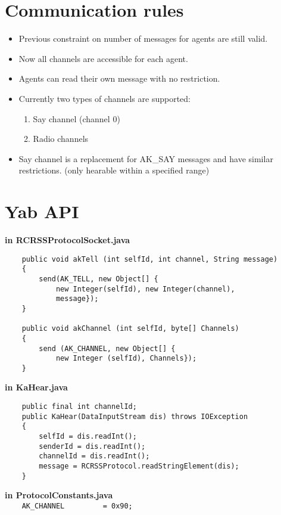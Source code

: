 \documentclass{article}
\begin{document}
\section{Communication rules}
\begin{itemize}
	\item Previous constraint on number of messages for agents are still valid.
	\item Now all channels are accessible for each agent.
	\item Agents can read their own message with no restriction.
	\item Currently two types of channels are supported:
	\begin{enumerate}
		\item Say channel (channel 0)
		\item Radio channels
	\end{enumerate}
	\item Say channel is a replacement for AK\_SAY messages and have
	similar restrictions. (only hearable within a specified range)
\end{itemize}
 
\newpage 
\appendix

\section{Yab API}
\label{yab}
\textbf{in RCRSSProtocolSocket.java}
\begin{verbatim}
    public void akTell (int selfId, int channel, String message)
    {
        send(AK_TELL, new Object[] {
            new Integer(selfId), new Integer(channel),   
            message});
    }
    
    public void akChannel (int selfId, byte[] Channels)
    {
        send (AK_CHANNEL, new Object[] {
            new Integer (selfId), Channels});  
    }
\end{verbatim}
\textbf{in KaHear.java}
\begin{verbatim}
    public final int channelId;
    public KaHear(DataInputStream dis) throws IOException 
    {
        selfId = dis.readInt();
        senderId = dis.readInt();
        channelId = dis.readInt();
        message = RCRSSProtocol.readStringElement(dis);
    }
\end{verbatim}
\textbf{in ProtocolConstants.java} \\
\verb$    AK_CHANNEL		 = 0x90; $
\end{document}
